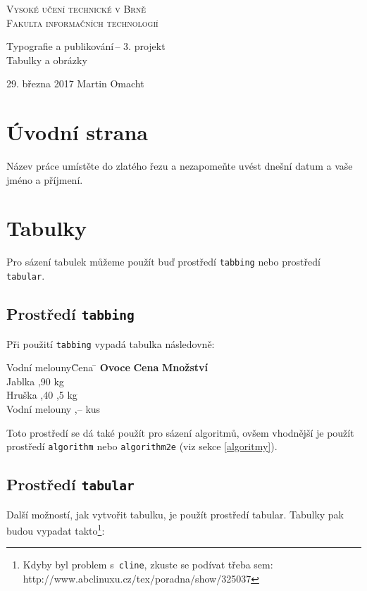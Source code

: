 \documentclass[11pt,a4paper]{article}
\begin{document}
	\begin{titlepage}
		\begin{center}
			\Huge
			\textsc{Vysoké učení technické v Brně\\[-2mm]
			\huge Fakulta informačních technologií}
		
			
			\LARGE
			Typografie a publikování\,-- 3. projekt\\[-0.5mm]
			\Huge Tabulky a obrázky
		\end{center}
		{\Large 29. března 2017 \hfill Martin Omacht}
	\end{titlepage}
	
	\section{Úvodní strana}
	Název práce umístěte do zlatého řezu a nezapomeňte uvést dnešní datum a vaše jméno a příjmení.
	
	\section{Tabulky}
	Pro sázení tabulek můžeme použít buď prostředí \texttt{tabbing} nebo prostředí \texttt{tabular}.

	\subsection{Prostředí \texttt{tabbing}}
	Při použití \texttt{tabbing} vypadá tabulka následovně:
	
		\begin{tabbing}
			Vodní melouny\qquad \= Cena \qquad \= \kill
			\textbf{Ovoce} 	\> \textbf{Cena} 	\> \textbf{Množství} \\
			Jablka 			,90			 kg \\
			Hruška			,40			,5 kg \\
			Vodní melouny	,--				 kus \\
		\end{tabbing}
	
	\noindent Toto prostředí se dá také použít pro sázení algoritmů, ovšem vhodnější je použít prostředí \texttt{algorithm} nebo \texttt{algorithm2e} (viz sekce \ref{algoritmy}).

	\subsection{Prostředí \texttt{tabular}}
	Další možností, jak vytvořit tabulku, je použít prostředí tabular. Tabulky pak 
	budou vypadat takto\footnote{Kdyby byl problem s\texttt{ cline}, zkuste se podívat třeba sem: http://www.abclinuxu.cz/tex/poradna/show/325037}:
	
\end{document}
